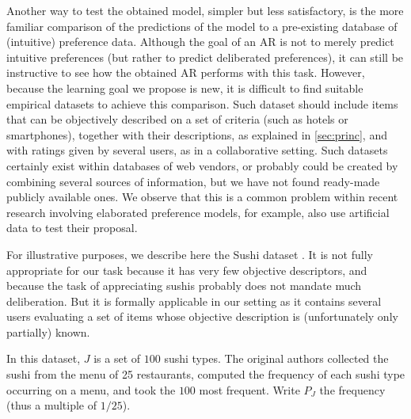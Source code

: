 \documentclass[version=3.21, pagesize, twoside=off, bibliography=totoc, DIV=calc, fontsize=12pt, a4paper, french, english]{scrartcl}
\begin{document}
Another way to test the obtained model, simpler but less satisfactory, is the more familiar comparison of the predictions of the model to a pre-existing database of (intuitive) preference data. Although the goal of an \ac{AR} is not to merely predict intuitive preferences (but rather to predict deliberated preferences), it can still be instructive to see how the obtained \ac{AR} performs with this task.
However, because the learning goal we propose is new, it is difficult to find suitable empirical datasets to achieve this comparison. Such dataset should include items that can be objectively described on a set of criteria (such as hotels or smartphones), together with their descriptions, as explained in \cref{sec:princ}, and with ratings given by several users, as in a collaborative setting. Such datasets certainly exist within databases of web vendors, or probably could be created by combining several sources of information, but we have not found ready-made publicly available ones. We observe that this is a common problem within recent research involving elaborated preference models, for example, \citet{teso_constructive_2016} also use artificial data to test their proposal.

For illustrative purposes, we describe here the Sushi dataset \citep{kamishima_nantonac_2003}. It is not fully appropriate for our task because it has very few objective descriptors, and because the task of appreciating sushis probably does not mandate much deliberation. But it is formally applicable in our setting as it contains several users evaluating a set of items whose objective description is (unfortunately only partially) known. 

In this dataset, $J$ is a set of $100$ sushi types. The original authors collected the sushi from the menu of 25 restaurants, computed the frequency of each sushi type occurring on a menu, and took the $100$ most frequent. Write $P_J$ the frequency (thus a multiple of $1/25$).
\end{document}
